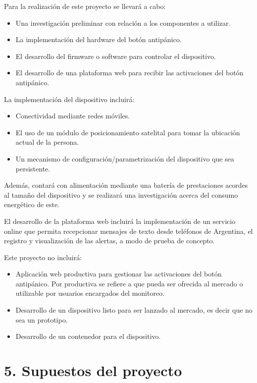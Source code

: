 \documentclass[
11pt, %
]{charter}
\begin{document}
Para la realización de este proyecto se llevará a cabo:
\begin{itemize}
	\item Una investigación preliminar con relación a los componentes a utilizar.
	\item La implementación del hardware del botón antipánico.
	\item El desarrollo del firmware o software para controlar el dispositivo.
	\item El desarrollo de una plataforma web para recibir las activaciones del botón antipánico.
\end{itemize}

La implementación del dispositivo incluirá:
\begin{itemize}
	\item Conectividad mediante redes móviles.
	\item El uso de un módulo de posicionamiento satelital para tomar la ubicación actual de la persona.
	\item Un mecanismo de configuración/parametrización del dispositivo que sea persistente.
\end{itemize}
Además, contará con alimentación mediante una batería de prestaciones acordes al tamaño del dispositivo y se realizará una investigación acerca del consumo energético de este.

El desarrollo de la plataforma web incluirá la implementación de un servicio online que permita recepcionar mensajes de texto desde teléfonos de Argentina, el registro y visualización de las alertas, a modo de prueba de concepto.

Este proyecto no incluirá:
\begin{itemize}
	\item Aplicación web productiva para gestionar las activaciones del botón antipánico. Por productiva se refiere a que pueda ser ofrecida al mercado o utilizable por usuarios encargados del monitoreo.
	\item Desarrollo de un dispositivo listo para ser lanzado al mercado, es decir que no sea un prototipo.
	\item Desarrollo de un contenedor para el dispositivo.
\end{itemize}

\section{5. Supuestos del proyecto}
\label{sec:supuestos}
\end{document}
